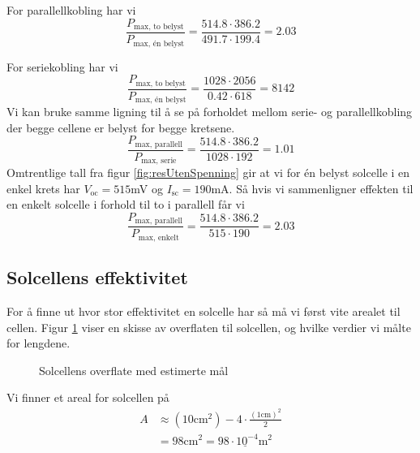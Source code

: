 \documentclass[a4paper,11pt, twocolumn]{article}
\begin{document}
For parallellkobling har vi 
\begin{equation}
	\frac{P_\text{max, to belyst}}{P_\text{max, \'en belyst}} = \frac{514.8\cdot386.2}{491.7\cdot199.4} = 2.03
\end{equation}

For seriekobling har vi 
\begin{equation}
	\frac{P_\text{max, to belyst}}{P_\text{max, \'en belyst}} = \frac{1028\cdot2056}{0.42\cdot618} = 8142
\end{equation}
Vi kan bruke samme ligning til å se på forholdet mellom serie- og parallellkobling der begge cellene er belyst for begge kretsene.
\begin{equation}
	\frac{P_\text{max, parallell}}{P_\text{max, serie}} = \frac{514.8\cdot386.2}{1028\cdot192} = 1.01
\end{equation}
Omtrentlige tall fra figur \ref{fig:resUtenSpenning} gir at vi for \'en  belyst solcelle i en enkel krets har $V_\text{oc}=515$mV og $I_\text{sc}=190$mA. Så hvis vi sammenligner effekten til en enkelt solcelle i forhold til to i parallell får vi
\begin{equation}
	\frac{P_\text{max, parallell}}{P_\text{max, enkelt}} = \frac{514.8\cdot386.2}{515\cdot190} = 2.03
\end{equation}
\subsection{Solcellens effektivitet}
For å finne ut hvor stor effektivitet en solcelle har så må vi først vite arealet til cellen. Figur \ref{fig:solcelleoverflate} viser en skisse av overflaten til solcellen, og hvilke verdier vi målte for lengdene.
\begin{figure}[!ht]
\centering
	\caption{Solcellens overflate med estimerte mål}
	\label{fig:solcelleoverflate}
\end{figure}
Vi finner et areal for solcellen på
\begin{align}
	A &\approx (10\text{cm}^2)-4\cdot\frac{(1\text{cm})^2}{2}\\
	&= 98\text{cm}^2 = \underline{98\cdot 10^{-4}\text{m}^2}
\end{align}
\end{document}
